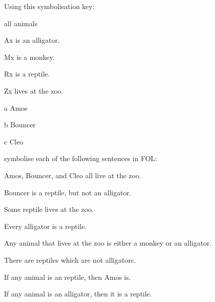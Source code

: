 \solutions
\problempart\label{pr.FOLalligators}
Using this symbolisation key:
\begin{ekey}
\item[\text{domain}] all animals
\item[Ax]  is an alligator.
\item[Mx]  is a monkey.
\item[Rx]  is a reptile.
\item[Zx]  lives at the zoo.
\item[a] Amos
\item[b] Bouncer
\item[c] Cleo
\end{ekey}
symbolise each of the following sentences in FOL:
\begin{earg}
\item Amos, Bouncer, and Cleo all live at the zoo. 
\item[] 
\item Bouncer is a reptile, but not an alligator. 
\item[] 
\item Some reptile lives at the zoo. 
\item[] 
\item Every alligator is a reptile. 
\item[] 
\item Any animal that lives at the zoo is either a monkey or an alligator. 
\item[] 
\item There are reptiles which are not alligators.
\item[] 
\item If any animal is an reptile, then Amos is.
\item[] 
\item If any animal is an alligator, then it is a reptile.
\item[] 
\end{earg}

